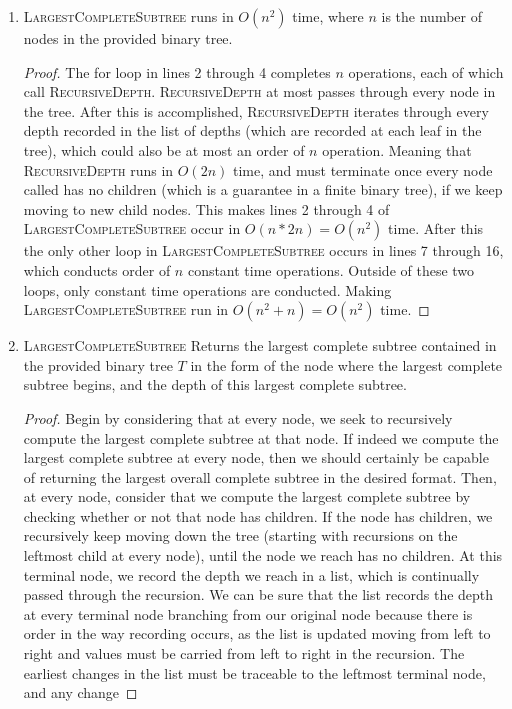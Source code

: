 \documentclass{article}
\begin{document}
\begin{enumerate}
\item \textsc{LargestCompleteSubtree} runs in $O(n^2)$ time, where $n$ is the number of nodes in the
	provided binary tree.
	\begin{proof}
		The for loop in lines 2 through 4 completes $n$ operations, each of which call 
		\textsc{RecursiveDepth}. \textsc{RecursiveDepth} at most passes through every node
		in the tree. After this is accomplished, \textsc{RecursiveDepth} iterates through
		every depth recorded in the list of depths (which are recorded at each leaf in the tree), 
		which could also be at most an order of $n$ operation. Meaning that 
		\textsc{RecursiveDepth} runs in $O(2n)$ time, and must terminate once every node called has 
		no children (which is a guarantee in a finite binary tree), if we keep moving to new child nodes.
		This makes lines 2 through 4 of \textsc{LargestCompleteSubtree} occur in $O(n*2n) = O(n^2)$ time.
		After this the only other loop in \textsc{LargestCompleteSubtree} occurs in lines 7 through 16,
		which conducts order of $n$ constant time operations. Outside of these two loops, only constant
		time operations are conducted. Making \textsc{LargestCompleteSubtree} run in $O(n^2+n)=O(n^2)$ time.
	\end{proof}
\item \textsc{LargestCompleteSubtree} Returns the largest complete subtree contained in the provided binary tree $T$
	in the form of the node where the largest complete subtree begins, and the depth of this largest complete
	subtree.
	\begin{proof}
		Begin by considering that at every node, we seek to recursively compute the largest complete
		subtree at that node. If indeed we compute the largest complete subtree at every node, then we
		should certainly be capable of returning the largest overall complete subtree in the desired
		format. Then, at every node, consider that we compute the largest complete subtree by checking
		whether or not that node has children. If the node has children, we recursively keep moving down
		the tree (starting with recursions on the leftmost child at every node), until the node we reach
		has no children. At this terminal node, we record the depth we reach in a list, which is continually
		passed through the recursion. We can be sure that the list records the depth at every terminal node
		branching from our original node because there is order in the way recording occurs, as the list
		is updated moving from left to right and values must be carried from left to right in the recursion.
		The earliest changes in the list must be traceable to the leftmost terminal node, and any change 

\end{proof}
\end{enumerate}
\end{document}

